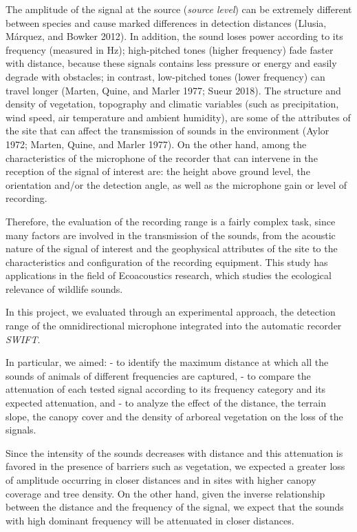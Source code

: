 \documentclass[fleqn,10pt,lineno]{wlpeerj} %
\begin{document}
The amplitude of the signal at the source (\emph{source level}) can be
extremely different between species and cause marked differences in
detection distances (Llusia, Márquez, and Bowker 2012). In addition, the
sound loses power according to its frequency (measured in Hz);
high-pitched tones (higher frequency) fade faster with distance, because
these signals contains less pressure or energy and easily degrade with
obstacles; in contrast, low-pitched tones (lower frequency) can travel
longer (Marten, Quine, and Marler 1977; Sueur 2018). The structure and
density of vegetation, topography and climatic variables (such as
precipitation, wind speed, air temperature and ambient humidity), are
some of the attributes of the site that can affect the transmission of
sounds in the environment (Aylor 1972; Marten, Quine, and Marler 1977).
On the other hand, among the characteristics of the microphone of the
recorder that can intervene in the reception of the signal of interest
are: the height above ground level, the orientation and/or the detection
angle, as well as the microphone gain or level of recording.

Therefore, the evaluation of the recording range is a fairly complex
task, since many factors are involved in the transmission of the sounds,
from the acoustic nature of the signal of interest and the geophysical
attributes of the site to the characteristics and configuration of the
recording equipment. This study has applications in the field of
Ecoacoustics research, which studies the ecological relevance of
wildlife sounds.

In this project, we evaluated through an experimental approach, the
detection range of the omnidirectional microphone integrated into the
automatic recorder \emph{SWIFT}.

In particular, we aimed: - to identify the maximum distance at which all
the sounds of animals of different frequencies are captured, - to
compare the attenuation of each tested signal according to its frequency
category and its expected attenuation, and - to analyze the effect of
the distance, the terrain slope, the canopy cover and the density of
arboreal vegetation on the loss of the signals.

Since the intensity of the sounds decreases with distance and this
attenuation is favored in the presence of barriers such as vegetation,
we expected a greater loss of amplitude occurring in closer distances
and in sites with higher canopy coverage and tree density. On the other
hand, given the inverse relationship between the distance and the
frequency of the signal, we expect that the sounds with high dominant
frequency will be attenuated in closer distances.
\end{document}
